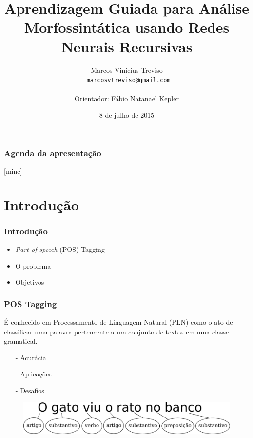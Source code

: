 \documentclass[10pt]{beamer}
\title{Aprendizagem Guiada para Análise Morfossintática usando Redes Neurais Recursivas}
\subtitle{}
\date{8 de julho de 2015}
\author[Treviso]{Marcos Vinícius Treviso\\\scriptsize\texttt{ marcosvtreviso@gmail.com}\\\\Orientador: Fábio Natanael Kepler\\}
\institute{Universidade Federal do Pampa}
\begin{document}
\maketitle

\begin{frame}
  \frametitle{Agenda da apresentação}
  [mine]
  \tableofcontents[hideallsubsections]
\end{frame}


\section{Introdução}


\begin{frame}[fragile]
  \frametitle{Introdução}

  \begin{itemize}
      \item \textit{Part-of-speech} (POS) Tagging 
      \item O problema
      \item Objetivos
    \end{itemize}


\end{frame}


\begin{frame}[fragile]
  \frametitle{POS Tagging}

  É conhecido em Processamento de Linguagem Natural (PLN) como o ato de classificar uma palavra pertencente a um conjunto de textos em uma classe gramatical.

 \begin{itemize}
      \item[-] Acurácia
      \item[-] Aplicações
      \item[-] Desafios
    \end{itemize}

  
    \begin{figure}[htb]
    \begin{center}
        \includegraphics[scale=0.5]{img/exemploclassificacao.pdf}
    \end{center}
  \end{figure}

\end{frame}
\end{document}
